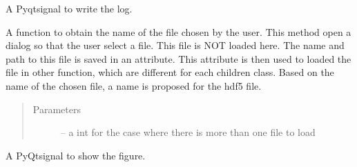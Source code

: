 \documentclass[letterpaper,10pt,english]{sphinxmanual}
\begin{document}
\begin{fulllineitems}
\begin{fulllineitems}
\end{fulllineitems}


\begin{fulllineitems}
\label{\detokenize{index:src_GUI.hydro_GUI_2.SubHydroW.send_log}}
A Pyqtsignal to write the log.

\end{fulllineitems}


\begin{fulllineitems}
\label{\detokenize{index:src_GUI.hydro_GUI_2.SubHydroW.show_dialog}}
A function to obtain the name of the file chosen by the user. This method open a dialog so that the user select
a file. This file is NOT loaded here. The name and path to this file is saved in an attribute. This attribute
is then used to loaded the file in other function, which are different for each children class. Based on the
name of the chosen file, a name is proposed for the hdf5 file.
\begin{quote}\begin{description}
\item[{Parameters}] \leavevmode
{} -- a int for the case where there is more than one file to load

\end{description}\end{quote}

\end{fulllineitems}


\begin{fulllineitems}
\label{\detokenize{index:src_GUI.hydro_GUI_2.SubHydroW.show_fig}}
A PyQtsignal to show the figure.

\end{fulllineitems}



\end{fulllineitems}
\end{document}
